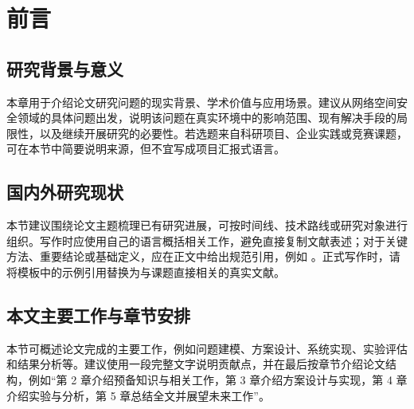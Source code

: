 \section{前言}

\subsection{研究背景与意义}

本章用于介绍论文研究问题的现实背景、学术价值与应用场景。建议从网络空间安全领域的具体问题出发，说明该问题在真实环境中的影响范围、现有解决手段的局限性，以及继续开展研究的必要性。若选题来自科研项目、企业实践或竞赛课题，可在本节中简要说明来源，但不宜写成项目汇报式语言。

\subsection{国内外研究现状}

本节建议围绕论文主题梳理已有研究进展，可按时间线、技术路线或研究对象进行组织。写作时应使用自己的语言概括相关工作，避免直接复制文献表述；对于关键方法、重要结论或基础定义，应在正文中给出规范引用，例如 \cite{knuth:1984,lesk:1977}。正式写作时，请将模板中的示例引用替换为与课题直接相关的真实文献。

\subsection{本文主要工作与章节安排}

本节可概述论文完成的主要工作，例如问题建模、方案设计、系统实现、实验评估和结果分析等。建议使用一段完整文字说明贡献点，并在最后按章节介绍论文结构，例如“第 2 章介绍预备知识与相关工作，第 3 章介绍方案设计与实现，第 4 章介绍实验与分析，第 5 章总结全文并展望未来工作”。
